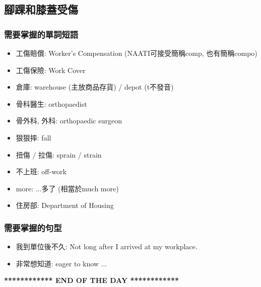 \subsection{腳踝和膝蓋受傷}
\subsubsection*{需要掌握的單詞短語}
\begin{itemize}
  \itemsep0em
  \item 工傷賠償: Worker's Compensation (NAATI可接受簡稱comp, 也有簡稱compo)
  \item 工傷保險: Work Cover
  \item 倉庫: warehouse (主放商品存貨) / depot (t不發音)
  \item 骨科醫生: orthopaedist
  \item 骨外科, 外科: orthopaedic surgeon
  \item 狠狠摔:  fall
  \item 扭傷 / 拉傷: sprain / strain
  \item 不上班: off-work
  \item {} more: ...多了 (相當於much more)
  \item 住房部: Department of Housing
\end{itemize}

\subsubsection*{需要掌握的句型}
\begin{itemize}
  \itemsep0em
  \item 我到單位後不久: Not long after I arrived at my workplace.
  \item 非常想知道: eager to know ...
\end{itemize}

\vspace{15mm}
\begin{center}
  \textbf{************ END OF THE DAY ************}
\end{center}